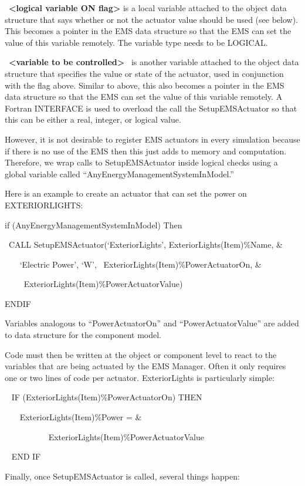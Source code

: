 ~\textbf{\textless{}logical variable ON flag\textgreater{}} is a local variable attached to the object data structure that says whether or not the actuator value should be used (see below). This becomes a pointer in the EMS data structure so that the EMS can set the value of this variable remotely. The variable type needs to be LOGICAL.

~\textbf{\textless{}variable to be controlled\textgreater{}}~ is another variable attached to the object data structure that specifies the value or state of the actuator, used in conjunction with the flag above. Similar to above, this also becomes a pointer in the EMS data structure so that the EMS can set the value of this variable remotely. A Fortran INTERFACE is used to overload the call the SetupEMSActuator so that this can be either a real, integer, or logical value.

However, it is not desirable to register EMS actuators in every simulation because if there is no use of the EMS then this just adds to memory and computation. Therefore, we wrap calls to SetupEMSActuator inside logical checks using a global variable called ``AnyEnergyManagementSystemInModel.''

Here is an example to create an actuator that can set the power on EXTERIORLIGHTS:

if (AnyEnergyManagementSystemInModel) Then

~CALL SetupEMSActuator(`ExteriorLights', ExteriorLights(Item)\%Name, \&

~~~ `Electric Power', `W',~ ExteriorLights(Item)\%PowerActuatorOn, \&

~~~~ ExteriorLights(Item)\%PowerActuatorValue)

ENDIF

Variables analogous to ``PowerActuatorOn'' and ``PowerActuatorValue'' are added to data structure for the component model.

Code must then be written at the object or component level to react to the variables that are being actuated by the EMS Manager. Often it only requires one or two lines of code per actuator. ExteriorLights is particularly simple:

~ IF (ExteriorLights(Item)\%PowerActuatorOn) THEN

~~~ ExteriorLights(Item)\%Power = \&

~~~~~~~~~~ ExteriorLights(Item)\%PowerActuatorValue

~ END IF

Finally, once SetupEMSActuator is called, several things happen:

